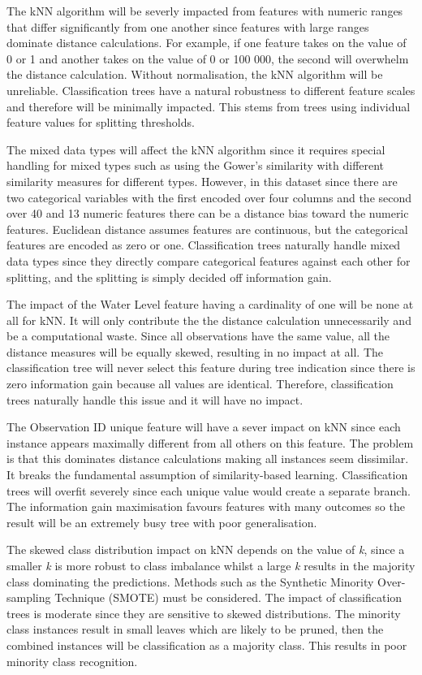 \documentclass[10pt, conference]{IEEEtran}
\begin{document}
The kNN algorithm will be severly impacted from features with numeric ranges that differ significantly from one another since features with large ranges dominate distance calculations. For example, if one feature takes on the value of 0 or 1 and another takes on the value of 0 or 100 000, the second will overwhelm the distance calculation. Without normalisation, the kNN algorithm will be unreliable. Classification trees have a natural robustness to different feature scales and therefore will be minimally impacted. This stems from trees using individual feature values for splitting thresholds.

The mixed data types will affect the kNN algorithm since it requires special handling for mixed types such as using the Gower's similarity with different similarity measures for different types. However, in this dataset since there are two categorical variables with the first encoded over four columns and the second over 40 and 13 numeric features there can be a distance bias toward the numeric features. Euclidean distance assumes features are continuous, but the categorical features are encoded as zero or one. Classification trees naturally handle mixed data types since they directly compare categorical features against each other for splitting, and the splitting is simply decided off information gain.

The impact of the Water Level feature having a cardinality of one will be none at all for kNN. It will only contribute the the distance calculation unnecessarily and be a computational waste. Since all observations have the same value, all the distance measures will be equally skewed, resulting in no impact at all. The classification tree will never select this feature during tree indication since there is zero information gain because all values are identical. Therefore, classification trees naturally handle this issue and it will have no impact.

The Observation ID unique feature will have a sever impact on kNN since each instance appears maximally different from all others on this feature. The problem is that this dominates distance calculations making all instances seem dissimilar. It breaks the fundamental assumption of similarity-based learning. Classification trees will overfit severely since each unique value would create a separate branch. The information gain maximisation favours features with many outcomes so the result will be an extremely busy tree with poor generalisation.

The skewed class distribution impact on kNN depends on the value of \textit{k}, since a smaller \textit{k} is more robust to class imbalance whilst a large \textit{k} results in the majority class dominating the predictions. Methods such as the Synthetic Minority Over-sampling Technique (SMOTE) must be considered. The impact of classification trees is moderate since they are sensitive to skewed distributions. The minority class instances result in small leaves which are likely to be pruned, then the combined instances will be classification as a majority class. This results in poor minority class recognition.
\end{document}
